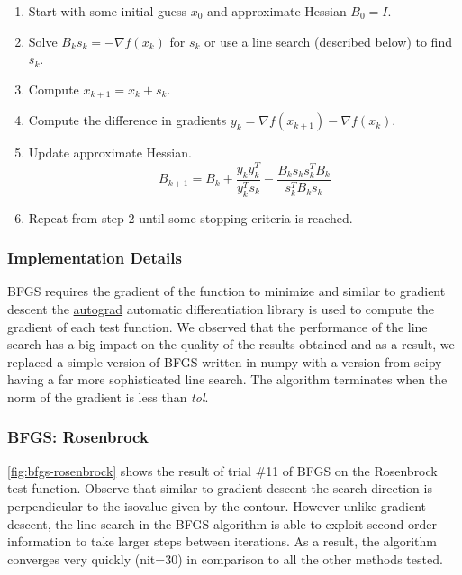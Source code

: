 \documentclass{vgtc}                          %
\begin{document}
\begin{enumerate}
\item Start with some initial guess $x_0$ and approximate Hessian $B_0 = I$.
\item Solve $B_k s_k = -\nabla f(x_k)$ for $s_k$ or use a line search (described below) to find $s_k$.
\item Compute $x_{k+1} = x_k + s_k$.
\item Compute the difference in gradients $y_k = \nabla f(x_{k+1}) - \nabla f(x_k)$.
\item Update approximate Hessian.
$$
B_{k+1} = B_k + \frac{y_k y_k^T}{y_k^T s_k} - \frac{B_k s_k s_k^T B_k}{s_k^T B_k s_k}
$$
\item Repeat from step 2 until some stopping criteria is reached.
\end{enumerate}

\subsubsection{Implementation Details}

BFGS requires the gradient of the function to minimize and similar to gradient descent the \href{https://autograd.readthedocs.io/en/latest/index.html}{autograd} automatic differentiation library is used to compute the gradient of each test function.  We observed that the performance of the line search has a big impact on the quality of the results obtained and as a result, we replaced a simple version of BFGS written in numpy with a version from scipy having a far more sophisticated line search.  The algorithm terminates when the norm of the gradient is less than \emph{tol}.

\subsubsection{BFGS: Rosenbrock}

\autoref{fig:bfgs-rosenbrock} shows the result of trial \#11 of BFGS on the Rosenbrock test function. Observe that similar to gradient descent the search direction is perpendicular to the isovalue given by the contour. However unlike gradient descent, the line search in the BFGS algorithm is able to exploit second-order information to take larger steps between iterations. As a result, the algorithm converges very quickly (nit=30) in comparison to all the other methods tested.
\end{document}
